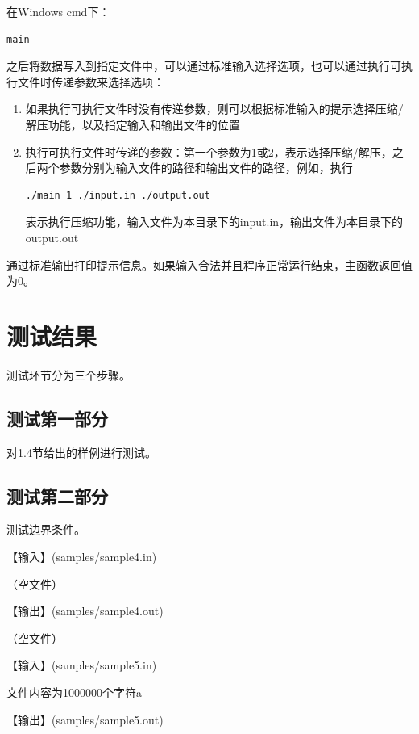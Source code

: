 \documentclass{article}
\begin{document}
在Windows cmd下：

\begin{lstlisting}[language={bash},
    basicstyle=\small\consolas]
main
\end{lstlisting}

之后将数据写入到指定文件中，可以通过标准输入选择选项，也可以通过执行可执行文件时传递参数来选择选项：

\begin{enumerate}
    \item 如果执行可执行文件时没有传递参数，则可以根据标准输入的提示选择压缩/解压功能，以及指定输入和输出文件的位置
    \item 执行可执行文件时传递的参数：第一个参数为1或2，表示选择压缩/解压，之后两个参数分别为输入文件的路径和输出文件的路径，例如，执行
\begin{lstlisting}[language={bash},
    basicstyle=\small\consolas]
./main 1 ./input.in ./output.out
\end{lstlisting}
    表示执行压缩功能，输入文件为本目录下的input.in，输出文件为本目录下的output.out
\end{enumerate}

通过标准输出打印提示信息。如果输入合法并且程序正常运行结束，主函数返回值为0。

\section{测试结果}

测试环节分为三个步骤。

\subsection{测试第一部分}

对1.4节给出的样例进行测试。

\subsection{测试第二部分}

测试边界条件。

【输入】(samples/sample4.in)

（空文件）

【输出】(samples/sample4.out)

（空文件）

【输入】(samples/sample5.in)

文件内容为1000000个字符a

【输出】(samples/sample5.out)
\end{document}
